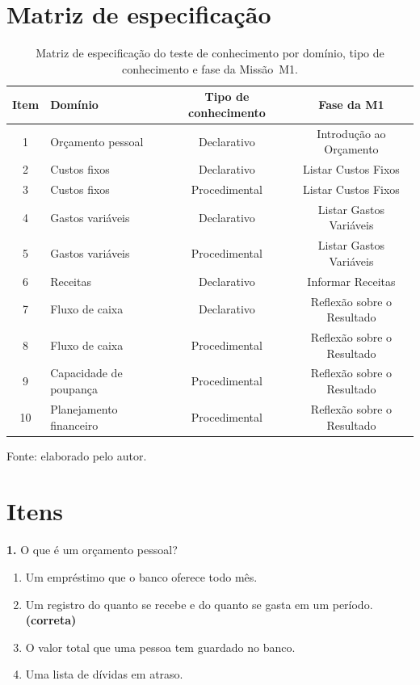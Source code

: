 \section*{Matriz de especificação}

\begin{table}[htbp]
\centering
\caption[Matriz de especificação do teste de conhecimento]{Matriz de especificação do teste de conhecimento por domínio, tipo de conhecimento e fase da Missão~M1.}
\label{tab:matriz_teste}
\begin{tabular}{clcc}
\hline
\textbf{Item} & \textbf{Domínio} & \textbf{Tipo de conhecimento} & \textbf{Fase da M1} \\
\hline
1  & Orçamento pessoal        & Declarativo    & Introdução ao Orçamento \\
2  & Custos fixos             & Declarativo    & Listar Custos Fixos \\
3  & Custos fixos             & Procedimental  & Listar Custos Fixos \\
4  & Gastos variáveis         & Declarativo    & Listar Gastos Variáveis \\
5  & Gastos variáveis         & Procedimental  & Listar Gastos Variáveis \\
6  & Receitas                 & Declarativo    & Informar Receitas \\
7  & Fluxo de caixa           & Declarativo    & Reflexão sobre o Resultado \\
8  & Fluxo de caixa           & Procedimental  & Reflexão sobre o Resultado \\
9  & Capacidade de poupança   & Procedimental  & Reflexão sobre o Resultado \\
10 & Planejamento financeiro  & Procedimental  & Reflexão sobre o Resultado \\
\hline
\end{tabular}

{\footnotesize Fonte: elaborado pelo autor.}
\end{table}

\section*{Itens}

\noindent\textbf{1.} O que é um orçamento pessoal?
\begin{enumerate}
    \item[(a)] Um empréstimo que o banco oferece todo mês.
    \item[(b)] Um registro do quanto se recebe e do quanto se gasta em um período. \textbf{(correta)}
    \item[(c)] O valor total que uma pessoa tem guardado no banco.
    \item[(d)] Uma lista de dívidas em atraso.
\end{enumerate}

